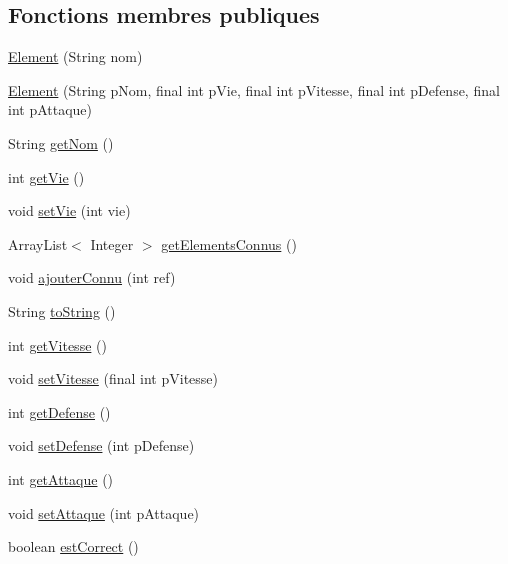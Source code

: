 \subsection*{Fonctions membres publiques}
\begin{DoxyCompactItemize}
\item 
\hyperlink{classindividu_1_1_element_a5f9423f93dc30636b89b87580f328b69}{Element} (String nom)
\item 
\hyperlink{classindividu_1_1_element_a87447c2bac2e3725755526830863b6c9}{Element} (String p\-Nom, final int p\-Vie, final int p\-Vitesse, final int p\-Defense, final int p\-Attaque)
\item 
String \hyperlink{classindividu_1_1_element_a2623a37998d1558ad9d9f9352f833cd4}{get\-Nom} ()
\item 
int \hyperlink{classindividu_1_1_element_ab41f49b096712f65285de4437f1b15b5}{get\-Vie} ()
\item 
void \hyperlink{classindividu_1_1_element_ad8c8123352986a7e80dea748e34922cc}{set\-Vie} (int vie)
\item 
Array\-List$<$ Integer $>$ \hyperlink{classindividu_1_1_element_a46430a36f795bf42832317f96fdeeb5e}{get\-Elements\-Connus} ()
\item 
void \hyperlink{classindividu_1_1_element_aaaa713cc814adae8a8dda825263b48db}{ajouter\-Connu} (int ref)
\item 
String \hyperlink{classindividu_1_1_element_af4c2b08d92cfad7532168a5ccd6c2ebb}{to\-String} ()
\item 
int \hyperlink{classindividu_1_1_element_a4ccd4fbf75bf5f1020aba19b9c78d43d}{get\-Vitesse} ()
\item 
void \hyperlink{classindividu_1_1_element_a3b22be2d0831e60fc80748c6d50fce7b}{set\-Vitesse} (final int p\-Vitesse)
\item 
int \hyperlink{classindividu_1_1_element_a5dfa6bd163796694365cbd3f5aa1548d}{get\-Defense} ()
\item 
void \hyperlink{classindividu_1_1_element_a88a02d10762bebc68026a7d8e55fa368}{set\-Defense} (int p\-Defense)
\item 
int \hyperlink{classindividu_1_1_element_a911dfb782eeaf4d472189ee9f89e9c78}{get\-Attaque} ()
\item 
void \hyperlink{classindividu_1_1_element_a8b31860817a08081a17b8fdf79ecb15e}{set\-Attaque} (int p\-Attaque)
\item 
boolean \hyperlink{classindividu_1_1_element_a3f46bfb561b56c3e0eca8fe8de7c42be}{est\-Correct} ()
\end{DoxyCompactItemize}


